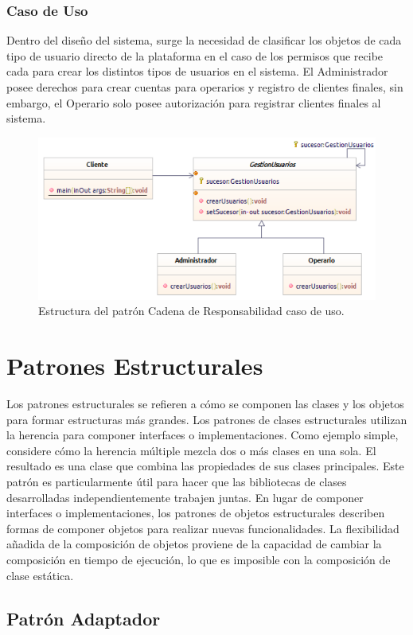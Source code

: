 \subsubsection{Caso de Uso}
Dentro del diseño del sistema, surge la necesidad de clasificar los objetos de cada tipo de usuario directo de la plataforma en el caso de los permisos que recibe cada para crear los distintos tipos de usuarios en el sistema. El Administrador posee derechos para crear cuentas para operarios y registro de clientes finales, sin embargo, el Operario solo posee autorización para registrar clientes finales al sistema.

\begin{figure}[th!]
	\centering
	\includegraphics[width=.7\linewidth]{imagenes/Patrones/Cadena_caso.pdf}
	\caption{Estructura del patrón Cadena de Responsabilidad caso de uso.\cite{gof}}	
\end{figure}

\section{Patrones Estructurales}
Los patrones estructurales se refieren a cómo se componen las clases y los objetos para formar estructuras más grandes. Los patrones de clases estructurales utilizan la herencia para componer interfaces o implementaciones. Como ejemplo simple, considere cómo la herencia múltiple mezcla dos o más clases en una sola. El resultado es una clase que combina las propiedades de sus clases principales. Este patrón es particularmente útil para hacer que las bibliotecas de clases desarrolladas independientemente trabajen juntas. En lugar de componer interfaces o implementaciones, los patrones de objetos estructurales describen formas de componer objetos para realizar nuevas funcionalidades. La flexibilidad añadida de la composición de objetos proviene de la capacidad de cambiar la composición en tiempo de ejecución, lo que es imposible con la composición de clase estática.\cite{gof}

\subsection{Patrón Adaptador}

